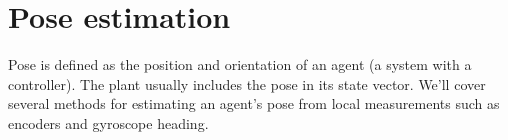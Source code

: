 
\chapter{Pose estimation}
\label{ch:pose_estimation}

Pose is defined as the position and orientation of an \gls{agent} (a system
with a controller). The plant usually includes the pose in its state vector.
We'll cover several methods for estimating an agent's pose from local
measurements such as encoders and gyroscope heading.

\renewcommand*{\chapterpath}{\partpath/pose-estimation}



